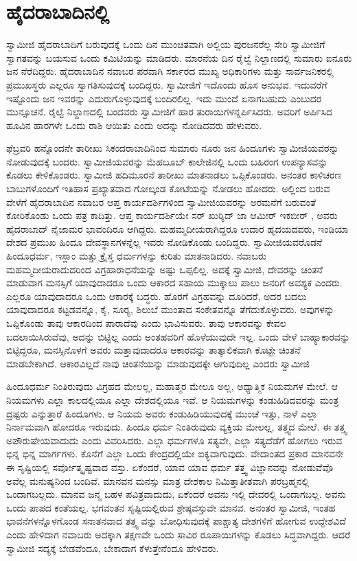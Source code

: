 
\chapter{ಹೈದರಾಬಾದಿನಲ್ಲಿ}

 ಸ್ವಾಮೀಜಿ ಹೈದರಾಬಾದಿಗೆ ಬರುವುದಕ್ಕೆ ಒಂದು ದಿನ ಮುಂಚಿತವಾಗಿ ಅಲ್ಲಿಯ ಪುರಜನರೆಲ್ಲ ಸೇರಿ ಸ್ವಾಮೀಜಿಗೆ ಸ್ವಾಗತವನ್ನು ಬಯಸುವ ಒಂದು ಕಮಿಟಿಯನ್ನು ಮಾಡಿದರು. ಮಾರನೆಯ ದಿನ ರೈಲ್ವೆ ನಿಲ್ದಾಣದಲ್ಲಿ ಸುಮಾರು ಐನೂರು ಜನ ನೆರೆದಿದ್ದರು. ಹೈದರಾಬಾದಿನ ನವಾಬರ ಪರವಾಗಿ ಸರ್ಕಾರದ ಮುಖ್ಯ ಅಧಿಕಾರಿಗಳು ಮತ್ತು ಸಾರ್ವಜನಿಕರಲ್ಲಿ ಪ್ರಮುಖಸ್ಥರು ಎಲ್ಲರೂ ಸ್ವಾಗತಿಸುವುದಕ್ಕೆ ಬಂದಿದ್ದರು. ಸ್ವಾಮೀಜಿಗೆ ಇದೊಂದು ಹೊಸ ಅನುಭವ. ಇದುವರೆಗೆ ಇಷ್ಟೊಂದು ಜನ ಇವರನ್ನು ಎದುರುಗೊಳ್ಳುವುದಕ್ಕೆ ಬಂದಿರಲಿಲ್ಲ. ಇದು ಮುಂದೆ ಏನಾಗಬಹುದು ಎಂಬುದರ ಮುನ್ಸೂಚನೆ. ರೈಲ್ವೆ ನಿಲ್ದಾಣದಲ್ಲಿ ಬಂದವರು ಸ್ವಾಮೀಜಿಗೆ ಹಾರ ತುರಾಯಿಗಳನ್ನರ್ಪಿಸಿದರು. ಅವರಿಗೆ ಅರ್ಪಿಸಿದ ಹೂವಿನ ಹಾರಗಳೇ ಒಂದು ರಾಶಿ ಆಯಿತು ಎಂದು ಅದನ್ನು ನೋಡಿದವರು ಹೇಳುವರು. 

 ಫೆಬ್ರವರಿ ಹನ್ನೊಂದನೇ ತಾರೀಖು ಸಿಕಂದರಾಬಾದಿನಿಂದ ಸುಮಾರು ನೂರು ಜನ ಹಿಂದೂಗಳು ಸ್ವಾಮೀಜಿಯವರನ್ನು ನೋಡುವುದಕ್ಕೆ ಬಂದರು. ಸ್ವಾಮೀಜಿಯವರನ್ನು ಮೆಹಬೂಬ್ ಕಾಲೇಜಿನಲ್ಲಿ ಒಂದು ಬಹಿರಂಗ ಉಪನ್ಯಾಸವನ್ನು ಕೊಡಲು ಕೇಳಿಕೊಂಡರು. ಸ್ವಾಮೀಜಿ ಹದಿಮೂರನೆ ತಾರೀಖು ಮಾತನಾಡಲು ಒಪ್ಪಿಕೊಂಡರು. ಅನಂತರ ಕಾಳಿಚರಣ ಬಾಬುಗಳೊಂದಿಗೆ ಇತಿಹಾಸ ಪ್ರಖ್ಯಾತವಾದ ಗೋಲ್ಕಂಡ ಕೋಟೆಯನ್ನು ನೋಡಲು ಹೋದರು. ಅಲ್ಲಿಂದ ಬರುವ ವೇಳೆಗೆ ಹೈದರಾಬಾದಿನ ನವಾಬರ ಆಪ್ತ ಕಾರ್ಯದರ್ಶಿಗಳಿಂದ ಸ್ವಾಮೀಜಿಯವರನ್ನು ಅರಮನೆಗೆ ಬರುವಂತೆ ಕೋರಿಕೊಂಡು ಒಂದು ಪತ್ರ ಕಾದಿತ್ತು. ಆಪ್ತ ಕಾರ್ಯದರ್ಶಿಯೇ ಸರ್ ಖುರ್‍ಶಿದ್ ಜಾ ಆಮೀರ್ ಇಕಬೀರ್ , ಅವರು ಹೈದರಾಬಾದ್ ನೈಜಾಮರ ಭಾವಂದಿರೂ ಆಗಿದ್ದರು. ಮಹಮ್ಮದೀಯರಾಗಿದ್ದರೂ ಉದಾರ ಹೃದಯದವರು, ಇಂಡಿಯಾ ದೇಶದ ಪ್ರಮುಖ ಹಿಂದೂ ದೇವಸ್ಥಾನಗಳನ್ನೆಲ್ಲ ಇವರು ನೋಡಿಕೊಂಡು ಬಂದಿದ್ದರು. ಸ್ವಾಮೀಜಿಯವರೊಡನೆ ಹಿಂದೂಧರ್ಮ, ಇಸ್ಲಾಂ ಮತ್ತು ಕ್ರೈಸ್ತ ಧರ್ಮಗಳನ್ನು ಕುರಿತು ಮಾತನಾಡಿದರು. ನವಾಬರು ಮಹಮ್ಮದೀಯರಾದುದರಿಂದ ವಿಗ್ರಹಾರಾಧನೆಯನ್ನು ಅಷ್ಟು ಒಪ್ಪಲಿಲ್ಲ. ಅದಕ್ಕೆ ಸ್ವಾಮೀಜಿ, ದೇವರನ್ನು ಚಿಂತನೆ ಮಾಡುವಾಗ ಮನಸ್ಸಿಗೆ ಯಾವುದಾದರೂ ಒಂದು ಆಕಾರದ ಸಹಾಯ ಮುಕ್ಕಾಲು ಪಾಲು ಜನರಿಗೆ ಅವಶ್ಯಕ ಎಂದರು. ಎಲ್ಲರೂ ಯಾವುದಾದರೂ ಒಂದು ಆಕಾರಕ್ಕೆ ಬದ್ಧರು. ಹೊರಗೆ ವಿಗ್ರಹವನ್ನು ದೂರಿದರೆ, ಅದರ ಬದಲು ಯಾವುದಾದರೂ ಕಟ್ಟಡವನ್ನೊ, ಕೈ, ಸೂರ‍್ಯ, ಶಿಲುಬೆ ಮುಂತಾದ ಸಂಕೇತವನ್ನೊ ತೆಗೆದುಕೊಳ್ಳುವರು. ಅವುಗಳನ್ನು ಒಪ್ಪಿಕೊಂಡು ತಾವು ಆಕಾರದಿಂದ ಪಾರಾದೆವು ಎಂದು ಭಾವಿಸುವರು. ತಾವು ಆಕಾರವನ್ನು ಕೇವಲ ಬದಲಾಯಿಸಿರುವೆವು, ಅದನ್ನು ಬಿಟ್ಟಿಲ್ಲ ಎಂದು ಅಂತಹವರಿಗೆ ಹೊಳೆಯುವುದೇ ಇಲ್ಲ. ಒಂದು ವೇಳೆ ಬಾಹ್ಯಾಕಾರವನ್ನು ಬಿಟ್ಟಿದ್ದರೂ, ಮನಸ್ಸಿನೊಳಗೆ ಅವರು ಮತ್ತಾವುದಾದರೂ ಆಕಾರವನ್ನು ತಾತ್ಕಾಲಿಕವಾಗಿ ಕೊಟ್ಟೇ ಚಿಂತನೆ ಮಾಡಬೇಕಾಗಿದೆ. ಆಕಾರವಿಲ್ಲದೆ ನಾವು ಚಿಂತನೆಯನ್ನು ಮಾಡುವುದಕ್ಕೇ ಆಗುವುದಿಲ್ಲ ಎಂದರು ಸ್ವಾಮೀಜಿ

 ಹಿಂದೂಧರ್ಮ ನಿಂತಿರುವುದು ವಿಗ್ರಹದ ಮೇಲಲ್ಲ, ಮಹಾತ್ಮರ ಮೇಲೂ ಅಲ್ಲ, ಅಧ್ಯಾತ್ಮಿಕ ನಿಯಮಗಳ ಮೇಲೆ. ಆ ನಿಯಮಗಳು ಎಲ್ಲಾ ಕಾಲದಲ್ಲಿಯೂ ಎಲ್ಲಾ ದೇಶದಲ್ಲಿಯೂ ಇವೆ. ಆ ನಿಯಮಗಳನ್ನು ಕಂಡುಹಿಡಿದವರನ್ನು ಮಂತ್ರ ದ್ರಷ್ಟರು ಎನ್ನುತ್ತಾರೆ ಹಿಂದೂಗಳು. ಆ ನಿಯಮ ಅವರು ಕಂಡುಹಿಡಿಯುವುದಕ್ಕೆ ಮುಂಚೆ ಇತ್ತು, ನಾಳೆ ಎಲ್ಲಾ ನಿರ್ನಾಮವಾಗಿ ಹೋದರೂ ಇರುವುದು. ಹಿಂದೂ ಧರ್ಮ ನಿಂತಿರುವುದು ವ್ಯಕ್ತಿಯ ಮೇಲಲ್ಲ, ತತ್ತ್ವದ ಮೇಲೆ. ಈ ತತ್ತ್ವ ಅಪೌರುಷೇಯವಾದುದು ಎಂದು ವಿವರಿಸಿದರು. ಎಲ್ಲಾ ಧರ್ಮಗಳೂ ಸತ್ಯವೇ, ಎಲ್ಲಾ ಸತ್ಯದೆಡೆಗೆ ಹೋಗಲು ಇರುವ ಭಿನ್ನ ಭಿನ್ನ ಮಾರ್ಗಗಳು. ಕೊನೆಗೆ ಎಲ್ಲಾ ಒಂದು ಕೇಂದ್ರದಲ್ಲಿಯೇ ಐಕ್ಯವಾಗುವುದು. ವೇದಾಂತದ ಪ್ರಕಾರ ಮಾನವನೇ ಈ ಸೃಷ್ಟಿಯಲ್ಲಿ ಸರ್ವೋತ್ಕೃಷ್ಟವಾದ ವಸ್ತು. ಏಕೆಂದರೆ, ಯಾವ ಯಾವ ಧರ್ಮ ತತ್ತ್ವ ವಿಜ್ಞಾನವನ್ನು ನೋಡುವೆವೊ ಅವೆಲ್ಲ ಮನುಷ್ಯನಿಂದ ಬಂದಿವೆ. ಮಾನವನ ಮನಸ್ಸು ಮಾತ್ರ ದೇಶಕಾಲ ನಿಮಿತ್ತಾತೀತವಾಗಿ ಪರಬ್ರಹ್ಮನಲ್ಲಿ ಒಂದಾಗಬಲ್ಲದು. ಮಾನವ ಜನ್ಮ ಬಹಳ ಪವಿತ್ರವಾದುದು, ಏಕೆಂದರೆ ಅವನು ಇಲ್ಲಿ ದೇವರಲ್ಲಿ ಒಂದಾಗಬಲ್ಲ. ಅವನು ಒಂದು ಪಾಪದ ಕಂತೆಯಲ್ಲ. ಭಗವಂತನ ಸೃಷ್ಟಿಯಲ್ಲಿರುವ ಶ್ರೇಷ್ಠವಸ್ತುವೇ ಮಾನವ. ಅನಂತರ ಸ್ವಾಮೀಜಿ, ಇಂತಹ ಭಾವನೆಗಳನ್ನೊಳಗೊಂಡ ಸನಾತನವಾದ ತತ್ತ್ವ ವನ್ನು ಬೋಧಿಸುವುದಕ್ಕೆ ಪಾಶ್ಚಾತ್ಯ ದೇಶಗಳಿಗೆ ಹೋಗುವ ಉದ್ದೇಶವಿದೆ ಎಂದು ಹೇಳಿದಾಗ ನವಾಬರು ಅದಕ್ಕಾಗಿ ತಕ್ಷಣವೇ ಒಂದು ಸಾವಿರ ರೂಪಾಯಿಗಳನ್ನು ಕೊಡಲು ಸಿದ್ಧವಾಗಿದ್ದರು. ಆದರೆ ಸ್ವಾಮೀಜಿ ಸದ್ಯಕ್ಕೆ ಬೇಡವೆಂದೂ, ಬೇಕಾದಾಗ ಕೆಳುತ್ತೇನೆಂದೂ ಹೇಳಿದರು.


